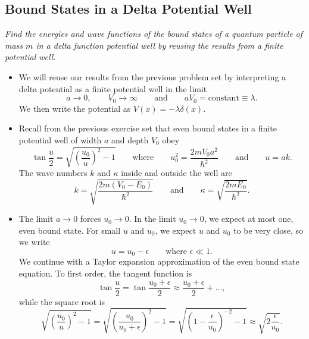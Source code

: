 \documentclass[11pt, a4paper]{article}
\newcommand{\eqtext}[1]{\qquad \text{#1} \qquad}
\begin{document}
\subsection{Bound States in a Delta Potential Well}
\textit{Find the energies and wave functions of the bound states of a quantum particle of mass $ m $ in a delta function potential well by reusing the results from a finite potential well}. 
\begin{itemize}
	\item We will reuse our results from the previous problem set by interpreting a delta potential as a finite potential well in the limit 
	\begin{equation*}
		a \to 0, \qquad V_{0} \to \infty \eqtext{and} aV_{0} = \text{constant} \equiv \lambda.
	\end{equation*}
    We then write the potential as $ V(x) = - \lambda \delta(x) $. 
	
	\item Recall from the previous exercise set that even bound states in a finite potential well of width $ a $ and depth $ V_{0} $ obey
	\begin{equation*}
		\tan \frac{u}{2} = \sqrt{\left(\frac{u_{0}}{u}\right)^{2} -1} \eqtext{where} u_{0}^{2} = \frac{2mV_{0}a^{2}}{\hbar^{2}} \eqtext{and} u = ak.
	\end{equation*}
	The wave numbers $ k $ and $ \kappa $ inside and outside the well are
	\begin{equation*}
		k = \sqrt{\frac{2m(V_{0}- E_{0})}{\hbar^{2}}} \eqtext{and} \kappa = \sqrt{\frac{2mE_{0}}{\hbar^{2}}}.
	\end{equation*}
	
	\item The limit $ a \to 0 $ forces $ u_{0} \to 0 $. In the limit $ u_{0} \to 0 $, we expect at most one, even bound state.	For small $ u $ and $ u_{0} $, we expect $ u $ and $ u_{0} $ to be very close, so we write
	\begin{equation*}
		u = u_{0} - \epsilon \qquad \text{where } \epsilon \ll 1.
	\end{equation*}
	We continue with a Taylor expansion approximation of the even bound state equation. To first order, the tangent function is
	\begin{equation*}
		\tan \frac{u}{2} = \tan \frac{u_{0} + \epsilon}{2} \approx \frac{u_{0} + \epsilon}{2} + \dots,
	\end{equation*}
	while the square root is
	\begin{equation*}
		\sqrt{\left(\frac{u_{0}}{u}\right)^{2} -1} = \sqrt{\left(\frac{u_{0}}{u_{0} + \epsilon}\right)^{2} -1} = \sqrt{\left(1 - \frac{\epsilon}{u_{0}}\right)^{-2} -1} \approx \sqrt{2\frac{\epsilon}{u_{0}}}.
	\end{equation*}
	

\end{itemize}
\end{document}
